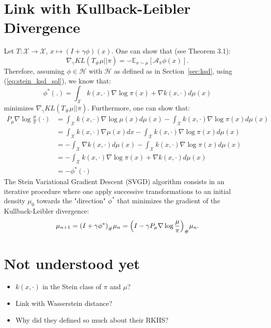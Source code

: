 \documentclass[runningheads,a4paper]{llncs}
\newcommand{\E}{\mathbb{E}}
\newcommand{\X}{\mathcal{X}}
\newcommand{\A}{\mathcal{A}}
\newcommand{\Hr}{\mathcal{H}}
\DeclarePairedDelimiter{\pare}{(}{)}
\begin{document}
\section{Link with Kullback-Leibler Divergence}
Let $T: \X \to \X$, $x \mapsto (I + \gamma \phi)(x)$. One can show that
(see \cite{https://doi.org/10.48550/arxiv.1608.04471} Theorem 3.1):
\begin{equation}
  \nabla_\gamma KL(T_\#\mu || \pi) = -\E_{x \sim \mu}[\A_\pi \phi(x)].
  \label{eq:grad_kl}
\end{equation}
Therefore, assuming $\phi \in \Hr$ with $\Hr$ as defined as in Section~\ref{sec:ksd},
using (\ref{eq:stein_ksd_sol}), we know that:
\begin{equation}
  \phi^*(.) = \int_\X k(x, \cdot) \nabla \log \pi(x) + \nabla k(x, \cdot) d\mu(x)
\end{equation}
minimizes $\nabla_\gamma KL(T_\#\mu || \pi)$.
Furthermore, one can show that:
\begin{equation}
  \begin{split}
    P_\mu \nabla \log \frac{\mu}{\pi} (\cdot) &=
      \int_\X k(x, \cdot) \nabla \log \mu(x) d\mu(x) - \int_\X k(x, \cdot) \nabla \log \pi (x) d\mu(x) \\
    &= \int_\X k(x, \cdot) \nabla \mu(x) dx - \int_\X k(x, \cdot) \nabla \log \pi (x) d\mu(x) \\
    &= - \int_\X \nabla k(x, \cdot) d\mu(x) - \int_\X k(x, \cdot) \nabla \log \pi (x) d\mu(x) \\
    &= - \int_\X k(x, \cdot) \nabla \log \pi (x) + \nabla k(x, \cdot) d\mu(x) \\
    &= -\phi^*(\cdot)
  \end{split}
\end{equation}
The Stein Variational Gradient Descent (SVGD) algorithm consists
in an iterative procedure where one apply successive transformations
to an initial density $\mu_0$ towards
the "direction" $\phi^*$ that minimizes the gradient of the Kullback-Leibler divergence:
\begin{equation}
  \mu_{n+1} = \pare*{ I + \gamma \phi^* }_\# \mu_n = \pare*{ I - \gamma P_\mu \nabla \log \frac{\mu}{\pi} }_\# \mu_n.
\end{equation}

\section{Not understood yet}
\begin{itemize}
  \item $k(x, \cdot)$ in the Stein class of $\pi$ and $\mu$?
  \item Link with Wasserstein distance?
  \item Why did they defined so much about their RKHS?
\end{itemize}
\end{document}

